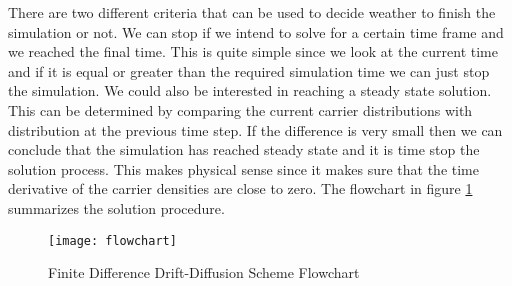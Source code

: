 There are two different criteria that can be used to decide weather to finish the simulation or not. We can stop if we intend to solve for a certain time frame and we reached the final time. This is quite simple since we look at the current time and if it is equal or greater than the required simulation time we can just stop the simulation. We could also be interested in reaching a steady state solution. This can be determined by comparing the current carrier distributions with distribution at the previous time step. If the difference is very small then we can conclude that the simulation has reached steady state and it is time stop the solution process. This makes physical sense since it makes sure that the time derivative of the carrier densities are close to zero. The flowchart in figure \ref{flowchart} summarizes the solution procedure.


\clearpage

\begin{figure}
\centering
\texttt{[image: flowchart]}
\caption{Finite Difference Drift-Diffusion Scheme Flowchart} 
\label{flowchart}
\end{figure}
